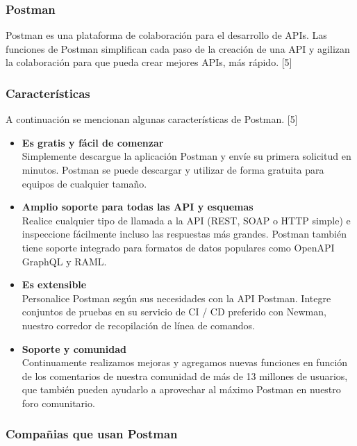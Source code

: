 \documentclass[twoside,twocolumn]{article}
\begin{document}
\subsubsection{Postman}

Postman es una plataforma de colaboración para el desarrollo de APIs. Las funciones de Postman simplifican cada paso de la creación de una API y agilizan la colaboración para que pueda crear mejores APIs, más rápido. [5]

\subsubsection{Características}

A continuación se mencionan algunas características de Postman. [5]

\begin{itemize}
  \item \textbf{Es gratis y fácil de comenzar} \\
  Simplemente descargue la aplicación Postman y envíe su primera solicitud en minutos. Postman se puede descargar y utilizar de forma gratuita para equipos de cualquier tamaño.

  \item \textbf{Amplio soporte para todas las API y esquemas} \\
  Realice cualquier tipo de llamada a la API (REST, SOAP o HTTP simple) e inspeccione fácilmente incluso las respuestas más grandes. Postman también tiene soporte integrado para formatos de datos populares como OpenAPI GraphQL y RAML.

  \item \textbf{Es extensible} \\
  Personalice Postman según sus necesidades con la API Postman. Integre conjuntos de pruebas en su servicio de CI / CD preferido con Newman, nuestro corredor de recopilación de línea de comandos.

  \item \textbf{Soporte y comunidad} \\
  Continuamente realizamos mejoras y agregamos nuevas funciones en función de los comentarios de nuestra comunidad de más de 13 millones de usuarios, que también pueden ayudarlo a aprovechar al máximo Postman en nuestro foro comunitario.
\end{itemize}

\subsubsection{Compañias que usan Postman}
\end{document}

